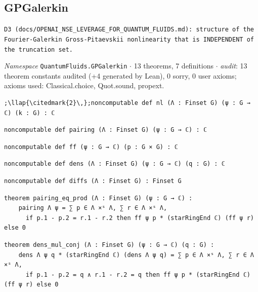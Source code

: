 \subsection{GPGalerkin}\label{appA:GPGalerkin}
{\footnotesize\raggedright\texttt{D3 (docs/\allowbreak{}OPENAI\_\allowbreak{}NSE\_\allowbreak{}LEVERAGE\_\allowbreak{}FOR\_\allowbreak{}QUANTUM\_\allowbreak{}FLUIDS.\allowbreak{}md): structure of the Fourier-\allowbreak{}Galerkin Gross-\allowbreak{}Pitaevskii nonlinearity that is INDEPENDENT of the truncation set.\allowbreak{}}\par}
{\footnotesize\raggedright\emph{Namespace} \texttt{QuantumFluids.\allowbreak{}GPGalerkin} $\cdot$ 13 theorems, 7 definitions $\cdot$ \emph{audit}: 13 theorem constants audited (+4 generated by Lean), 0 sorry, 0 user axioms; axioms used: Classical.choice, Quot.sound, propext.\par}
\vspace{1pt}
\begin{lstlisting}[style=leancat]
;\llap{\citedmark{2}\,};noncomputable def nl (Λ : Finset G) (ψ : G → ℂ) (k : G) : ℂ
\end{lstlisting}

\begin{lstlisting}[style=leancat]
noncomputable def pairing (Λ : Finset G) (ψ : G → ℂ) : ℂ
\end{lstlisting}

\begin{lstlisting}[style=leancat]
noncomputable def ff (ψ : G → ℂ) (p : G × G) : ℂ
\end{lstlisting}

\begin{lstlisting}[style=leancat]
noncomputable def dens (Λ : Finset G) (ψ : G → ℂ) (q : G) : ℂ
\end{lstlisting}

\begin{lstlisting}[style=leancat]
noncomputable def diffs (Λ : Finset G) : Finset G
\end{lstlisting}

\begin{lstlisting}[style=leancat]
theorem pairing_eq_prod (Λ : Finset G) (ψ : G → ℂ) :
    pairing Λ ψ = ∑ p ∈ Λ ×ˢ Λ, ∑ r ∈ Λ ×ˢ Λ,
      if p.1 - p.2 = r.1 - r.2 then ff ψ p * (starRingEnd ℂ) (ff ψ r) else 0
\end{lstlisting}

\begin{lstlisting}[style=leancat]
theorem dens_mul_conj (Λ : Finset G) (ψ : G → ℂ) (q : G) :
    dens Λ ψ q * (starRingEnd ℂ) (dens Λ ψ q) = ∑ p ∈ Λ ×ˢ Λ, ∑ r ∈ Λ ×ˢ Λ,
      if p.1 - p.2 = q ∧ r.1 - r.2 = q then ff ψ p * (starRingEnd ℂ) (ff ψ r) else 0
\end{lstlisting}

